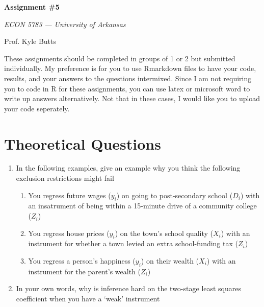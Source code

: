 \documentclass[12pt]{article}
\begin{document}
\begin{center}
  {\Huge\bf Assignment \#5}
  
  \smallskip
  {\large\it  ECON 5783 — University of Arkansas}

  \medskip
  {\large Prof. Kyle Butts}
\end{center}

These assignments should be completed in groups of 1 or 2 but submitted individually. My preference is for you to use Rmarkdown files to have your code, results, and your answers to the questions intermixed. Since I am not requiring you to code in R for these assignments, you can use latex or microsoft word to write up answers alternatively. Not that in these cases, I would like you to upload your code seperately. 


\section*{Theoretical Questions}

\begin{enumerate}
  \item In the following examples, give an example why you think the following exclusion restrictions might fail
  \begin{enumerate}
    \item You regress future wages ($y_i$) on going to post-secondary school ($D_i$) with an insatrument of being within a 15-minute drive of a community college ($Z_i$)
    
    \item You regress house prices ($y_i$) on the town's school quality ($X_i$) with an instrument for whether a town levied an extra school-funding tax ($Z_i$)
    
    \item You regress a person's happiness ($y_i$) on their wealth ($X_i$) with an instrument for the parent's wealth ($Z_i$)
  \end{enumerate}

  \item In your own words, why is inference hard on the two-stage least squares coefficient when you have a `weak' instrument
\end{enumerate}


\end{document}
